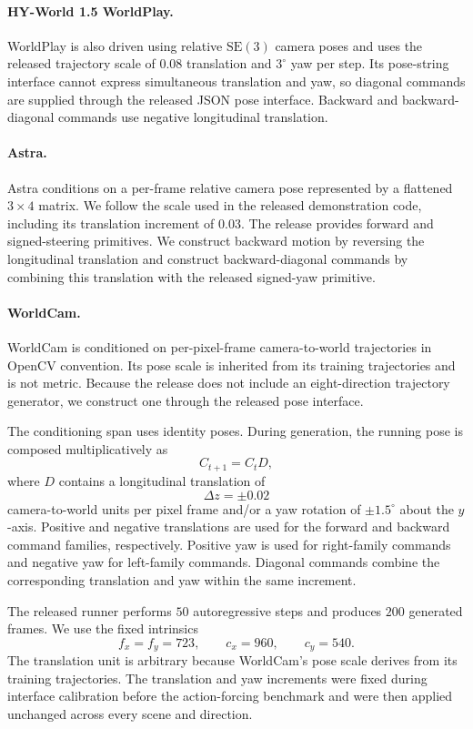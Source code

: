 \documentclass[letterpaper]{article} %
\begin{document}
\paragraph{HY-World 1.5 WorldPlay.}
WorldPlay is also driven using relative $\mathrm{SE}(3)$ camera poses and uses
the released trajectory scale of $0.08$ translation and $3^\circ$ yaw per
step. Its pose-string interface cannot express simultaneous translation and
yaw, so diagonal commands are supplied through the released JSON pose
interface. Backward and backward-diagonal commands use negative longitudinal
translation.

\paragraph{Astra.}
Astra conditions on a per-frame relative camera pose represented by a
flattened $3\times4$ matrix. We follow the scale used in the released
demonstration code, including its translation increment of $0.03$. The release
provides forward and signed-steering primitives. We construct backward motion
by reversing the longitudinal translation and construct backward-diagonal
commands by combining this translation with the released signed-yaw
primitive.

\paragraph{WorldCam.}
WorldCam is conditioned on per-pixel-frame camera-to-world trajectories in
OpenCV convention. Its pose scale is inherited from its training trajectories
and is not metric. Because the release does not include an eight-direction
trajectory generator, we construct one through the released pose interface.

The conditioning span uses identity poses. During generation, the running pose
is composed multiplicatively as
\[
C_{t+1}=C_tD,
\]
where $D$ contains a longitudinal translation of
\[
\Delta z=\pm0.02
\]
camera-to-world units per pixel frame and/or a yaw rotation of
$\pm1.5^\circ$ about the $y$-axis. Positive and negative translations are used
for the forward and backward command families, respectively. Positive yaw is
used for right-family commands and negative yaw for left-family commands.
Diagonal commands combine the corresponding translation and yaw within the
same increment.

The released runner performs $50$ autoregressive steps and produces $200$
generated frames. We use the fixed intrinsics
\[
f_x=f_y=723,\qquad c_x=960,\qquad c_y=540.
\]
The translation unit is arbitrary because WorldCam's pose scale derives from
its training trajectories. The translation and yaw increments were fixed
during interface calibration before the action-forcing benchmark and were
then applied unchanged across every scene and direction.
\end{document}
